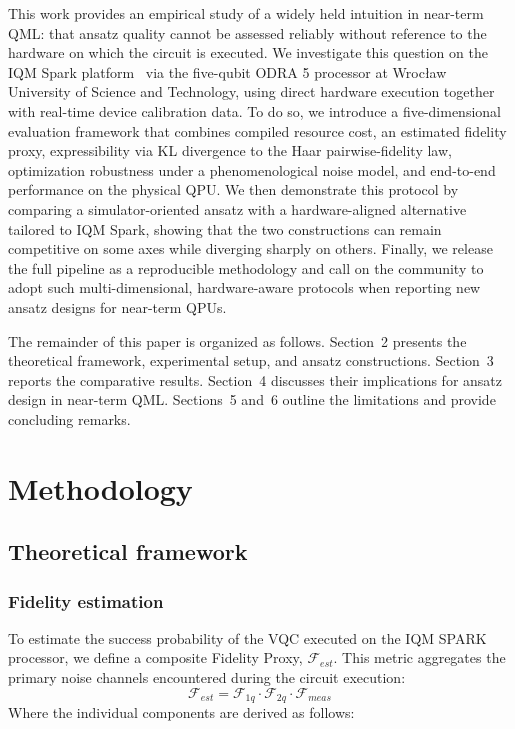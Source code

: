 \documentclass[11pt]{article}
\begin{document}
This work provides an empirical study of a widely held intuition in near-term QML: that ansatz quality cannot be assessed reliably without reference to the hardware on which the circuit is executed. We investigate this question on the IQM Spark platform~\cite{iqmspark} via the five-qubit ODRA 5 processor at Wrocław University of Science and Technology, using direct hardware execution together with real-time device calibration data. To do so, we introduce a five-dimensional evaluation framework that combines compiled resource cost, an estimated fidelity proxy, expressibility via KL divergence to the Haar pairwise-fidelity law, optimization robustness under a phenomenological noise model, and end-to-end performance on the physical QPU. We then demonstrate this protocol by comparing a simulator-oriented ansatz with a hardware-aligned alternative tailored to IQM Spark, showing that the two constructions can remain competitive on some axes while diverging sharply on others. Finally, we release the full pipeline as a reproducible methodology and call on the community to adopt such multi-dimensional, hardware-aware protocols when reporting new ansatz designs for near-term QPUs.

The remainder of this paper is organized as follows. Section~2 presents the theoretical framework, experimental setup, and ansatz constructions. Section~3 reports the comparative results. Section~4 discusses their implications for ansatz design in near-term QML. Sections~5 and~6 outline the limitations and provide concluding remarks.

\section{Methodology}
\subsection{Theoretical framework}
\subsubsection{Fidelity estimation}
To estimate the success probability of the VQC executed on the IQM SPARK processor, we define a composite Fidelity Proxy, $\mathcal{F}_{est}$. This metric aggregates the primary noise channels encountered during the circuit execution\cite{arute2019supremacy}: $$\mathcal{F}_{est} = \mathcal{F}_{1q} \cdot \mathcal{F}_{2q} \cdot \mathcal{F}_{meas}$$Where the individual components are derived as follows:
\end{document}

